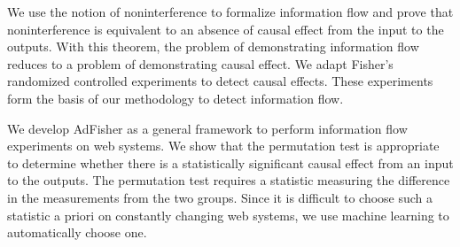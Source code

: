 \documentclass[10pt, onecolumn]{report}
\begin{document}
We use the notion of noninterference to formalize information flow
and prove that noninterference is equivalent to an absence of  
causal effect from the input to the outputs. With this theorem, 
the problem of demonstrating information flow reduces to a problem 
of demonstrating causal effect. 
We adapt Fisher's randomized controlled experiments to detect causal effects. 
These experiments form the basis of our methodology to detect information 
flow\cite{tschantz2015methodology}. 

We develop AdFisher as a general framework to perform information flow experiments
on web systems. We show that the
permutation test is appropriate to determine whether there 
is a statistically significant causal effect from an input to the outputs. 
The permutation test requires a statistic measuring the difference in the
measurements from the two groups. Since it is difficult to choose 
such a statistic a priori on constantly changing web systems, 
we use machine learning to automatically choose one. 
\end{document}

